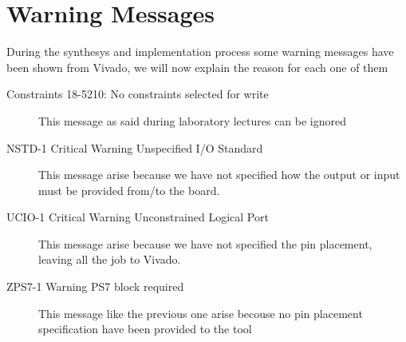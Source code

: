 \section {Warning Messages}
During the synthesys and implementation process some warning messages have been
shown from Vivado, we will now explain the reason for each one of them
\begin{description}
	\item[Constraints 18-5210: No constraints selected for write]
		This message as said during laboratory lectures can be ignored
	\item[NSTD-1 Critical Warning Unspecified I/O Standard]
		This message arise because we have not specified how the output
		or input must be provided from/to the board. 
	\item[UCIO-1 Critical Warning Unconstrained Logical Port]
		This message arise because we have not specified the pin
		placement, leaving all the job to Vivado.
	\item[ZPS7-1 Warning PS7 block required]
		This message like the previous one arise becouse no pin
		placement specification have been provided to the tool

\end{description}
